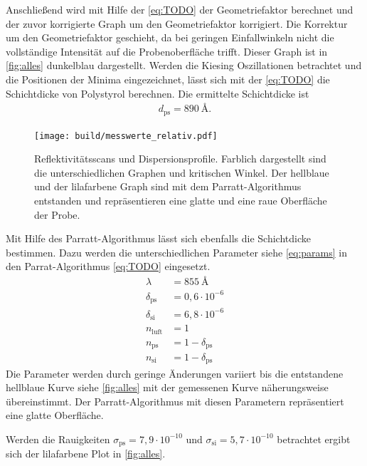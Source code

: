 Anschließend wird mit Hilfe der \autoref{eq:TODO} der Geometriefaktor berechnet und der zuvor korrigierte Graph um den Geometriefaktor korrigiert. 
Die Korrektur um den Geometriefaktor geschieht, da bei geringen Einfallwinkeln nicht die vollständige Intensität auf die Probenoberfläche trifft. 
Dieser Graph ist in \autoref{fig:alles} dunkelblau dargestellt. 
Werden die Kiesing Oszillationen betrachtet und die Positionen der Minima eingezeichnet, lässt sich mit der \autoref{eq:TODO} die 
Schichtdicke von Polystyrol berechnen.
Die ermittelte Schichtdicke ist
\begin{align*}
    d_\text{ps} = \SI{890}{\angstrom}.
\end{align*}
\begin{figure}
    \centering
    \texttt{[image: build/messwerte\_relativ.pdf]}
    \caption{Reflektivitätsscans und Dispersionsprofile. Farblich dargestellt sind die unterschiedlichen Graphen und kritischen Winkel.
            Der hellblaue und der lilafarbene Graph sind mit dem Parratt-Algorithmus entstanden und repräsentieren eine glatte und eine raue Oberfläche der Probe. }
    \label{fig:alles}
\end{figure}
\FloatBarrier
Mit Hilfe des Parratt-Algorithmus lässt sich ebenfalls die Schichtdicke bestimmen. 
Dazu werden die unterschiedlichen Parameter siehe \autoref{eq:params} in den Parrat-Algorithmus \autoref{eq:TODO} eingesetzt.
\begin{equation}\label{eq:params}    
    \begin{split}
        \lambda &= \SI{855}{\angstrom}\\
        \delta_\text{ps} &= 0,6\cdot 10^{-6}\\
        \delta_\text{si}&= 6,8\cdot 10^{-6} \\
        n_\text{luft} &= 1 \\
        n_\text{ps} &= 1 - \delta_\text{ps} \\
        n_\text{si} &= 1 - \delta_\text{ps} 
    \end{split}
\end{equation}
Die Parameter werden durch geringe Änderungen variiert bis die entstandene hellblaue Kurve siehe \autoref{fig:alles} mit der gemessenen
Kurve näherungsweise übereinstimmt. 
Der Parratt-Algorithmus mit diesen Parametern repräsentiert eine glatte Oberfläche.

Werden die Rauigkeiten $\sigma_\text{ps} = 7,9\cdot 10^{-10}$ und $\sigma_\text{si} = 5,7\cdot 10^{-10}$
betrachtet ergibt sich der lilafarbene Plot in \autoref{fig:alles}.

